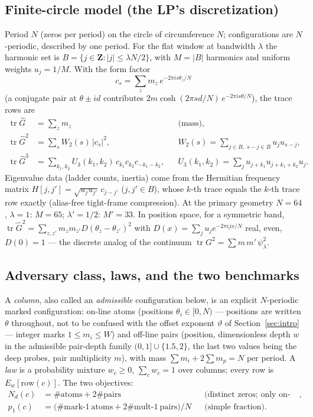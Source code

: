 \documentclass[11pt]{article}
\theoremstyle{plain}
\theoremstyle{definition}
\theoremstyle{remark}
\newcommand{\Z}{\mathbf{Z}}
\newcommand{\Gh}{\widehat{G}}
\newcommand{\tr}{\operatorname{tr}}
\newcommand{\Nd}{N_{d}}
\begin{document}
\subsection{Finite-circle model (the LP's discretization)}
\label{sec:finitecircle}

Period $N$ (zeros per period) on the circle of circumference $N$; configurations
are $N$-periodic, described by one period. For the flat window at bandwidth
$\lambda$ the harmonic set is $B = \{j \in \Z : |j| \le \lambda N/2\}$, with
$M = |B|$ harmonics and uniform weights $u_j = 1/M$. With the form factor
\[
  c_s = \sum_z m_z\, e^{-2\pi i s \theta_z/N}
\]
(a conjugate pair at $\theta \pm i d$ contributes
$2m \cosh(2\pi s d/N)\, e^{-2\pi i s \theta/N}$), the trace rows are
\begin{align*}
  \tr \Gh &= \sum_z m_z && \text{(mass)},\\
  \tr \Gh^2 &= \sum_s W_2(s)\, |c_s|^2,
    && W_2(s) = \sum_{j \in B,\; s - j \in B} u_j u_{s-j},\\
  \tr \Gh^3 &= \sum_{k_1, k_2} U_3(k_1, k_2)\, c_{k_1} c_{k_2} c_{-k_1-k_2},
    && U_3(k_1, k_2) = \sum_j u_{j+k_1} u_{j+k_1+k_2} u_j .
\end{align*}
Eigenvalue data (ladder counts, inertia) come from the Hermitian frequency matrix
$H[j, j'] = \sqrt{u_j u_{j'}}\, c_{j - j'}$ ($j, j' \in B$), whose $k$-th trace
equals the $k$-th trace row exactly (alias-free tight-frame compression). At the
primary geometry $N = 64$, $\lambda = 1$: $M = 65$; $\lambda' = 1/2$: $M' = 33$.
In position space, for a symmetric band,
$\tr \Gh^2 = \sum_{z, z'} m_z m_{z'} D(\theta_z - \theta_{z'})^2$ with
$D(x) = \sum_j u_j e^{-2\pi i j x/N}$ real, even, $D(0) = 1$ --- the discrete
analog of the continuum $\tr G^2 = \sum m\, m'\, \psi_\lambda^2$.

\subsection{Adversary class, laws, and the two benchmarks}
\label{sec:adversary}

A \emph{column}, also called an \emph{admissible} configuration below, is an
explicit $N$-periodic marked configuration: on-line atoms
(positions $\theta_i \in [0, N)$ --- positions are written $\theta$ throughout,
not to be confused with the offset exponent $\vartheta$ of
Section~\ref{sec:intro} --- integer marks $1 \le m_i \le W$) and off-line
pairs (position, dimensionless depth $w$ in the admissible pair-depth family
$(0, 1] \cup \{1.5, 2\}$, the last two values being the deep probes, pair
multiplicity $m$), with mass
$\sum m_i + 2 \sum m_p = N$ per period. A \emph{law} is a probability mixture
$w_c \ge 0$, $\sum_c w_c = 1$ over columns; every row is $E_w[\mathrm{row}(c)]$.
The two objectives:
\begin{align*}
  \Nd(c) &= \#\mathrm{atoms} + 2\#\mathrm{pairs}
    && \text{(distinct zeros; only on-line multiples reduce it)},\\
  p_1(c) &= \bigl( \#\text{mark-}1\ \mathrm{atoms}
      + 2\#\text{mult-}1\ \mathrm{pairs} \bigr)/N
    && \text{(simple fraction)}.
\end{align*}
\end{document}
